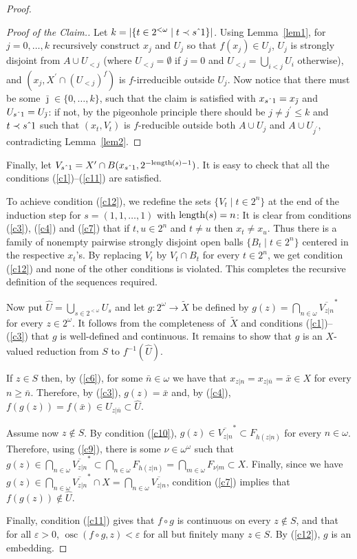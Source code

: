 \documentclass{raex}
\theoremstyle{plain}
\theoremstyle{definition}
\theoremstyle{remark}
\def\conc{\hat{\hbox to .4em{}}}
\def\l{\textnormal{length}}
\def\osc{\operatorname{osc}}
\begin{document}
\begin{proof}
\begin{proof}[Proof of the Claim.]
Let $k=|\{t\in 2^{<\omega} \mid t\prec s\conc1\}|$. Using Lemma~\ref{lem1}, for $j=0,\ldots,k$ recursively construct $x_j$ and $U_j$ so that $f(x_j)\in U_j$, $U_j$ is strongly disjoint from $A\cup U_{<j}$ (where $U_{<j}=\emptyset$ if $j=0$ and $U_{<j}=\bigcup_{i<j}U_i$ otherwise), and $(x_j,X^\prime\cap(U_{<j})^f)$ is $f$-irreducible outside $U_j$. Now notice that there must be some $\bar{\jmath}\in\{0,\ldots,k\}$, such that the claim is satisfied with $x_{s\conc1}=x_{\bar{\jmath}}$ and $U_{s\conc1}=U_{\bar{\jmath}}$: if not, by the pigeonhole principle there should be $j\neq j^\prime\le k$ and $t\prec s\conc1$ such that $(x_t,V_t)$ is $f$-reducible outside both $A\cup U_j$ and $A\cup U_{j^\prime}$, contradicting Lemma~\ref{lem2}.
\end{proof}

Finally, let $V_{s \conc 1}=X^\prime\cap B(x_{s\conc1},2^{-\l(s)-1})$. It is easy to check that all the conditions (\ref{c1})--(\ref{c11}) are satisfied. 

To achieve condition (\ref{c12}), we redefine the sets $\{V_t \mid t\in 2^n\}$ at the end of the induction step for $s=(1,1,\ldots,1)$ with $\l(s)=n$: It is clear from conditions (\ref{c3}), (\ref{c4}) and (\ref{c7}) that if $t,u\in 2^n$ and $t\neq u$ then $x_t\neq x_u$. Thus there is a family of nonempty pairwise strongly disjoint open balls $\{B_t \mid t\in 2^n\}$ centered in the respective $x_t$'s. By replacing $V_t$ by $V_t\cap B_t$ for every $t\in 2^n$, we get condition (\ref{c12}) and none of the other conditions is violated. This completes the recursive definition of the sequences required.

Now put $\widehat{U}=\bigcup_{s\in 2^{<\omega}}U_s$ and let $g \colon 2^\omega\to\widetilde{X}$ be defined by $g(z)=\bigcap_{n\in\omega}\overline{V_{z|n}}^\ast$ for every $z\in 2^\omega$. It follows from the completeness of~$\widetilde{X}$ and conditions (\ref{c1})--(\ref{c3}) that $g$ is well-defined and continuous. It remains to show that $g$ is an $X$-valued reduction from $S$ to $f^{-1}(\widehat{U})$.

If $z\in S$ then, by (\ref{c6}), for some $\bar{n}\in\omega$ we have that $x_{z|n}=x_{z|\bar{n}}=\bar{x}\in X$ for every $n\ge\bar{n}$. Therefore, by (\ref{c3}), $g(z)=\bar{x}$ and, by (\ref{c4}), $f(g(z))=f(\bar{x})\in U_{z|\bar{n}}\subset\widehat{U}$.

Assume now $z\not\in S$. By condition (\ref{c10}), $g(z)\in\overline{V_{z|n}}^\ast\subset F_{h(z|n)}$ for every $n\in\omega$. Therefore, using (\ref{c9}), there is some $\nu\in\omega^\omega$ such that $g(z)\in\bigcap_{n\in\omega}\overline{V_{z|n}}^\ast\subset\bigcap_{n\in\omega} F_{h(z|n)}= \bigcap_{m\in\omega} F_{\nu|m}\subset X$. Finally, since we have $g(z)\in\bigcap_{n\in\omega}\overline{V_{z|n}}^\ast\cap X=\bigcap_{n\in\omega}\overline{V_{z|n}}$, condition (\ref{c7}) implies that $f(g(z))\not\in\widehat{U}$.

Finally, condition (\ref{c11}) gives that $f \circ g$ is continuous on every $z \notin S$, and that for all $\varepsilon>0$, $\osc(f\circ g,z)< \varepsilon$ for all but finitely many $z \in S$. By (\ref{c12}), $g$ is an embedding.
\end{proof}
\end{document}
